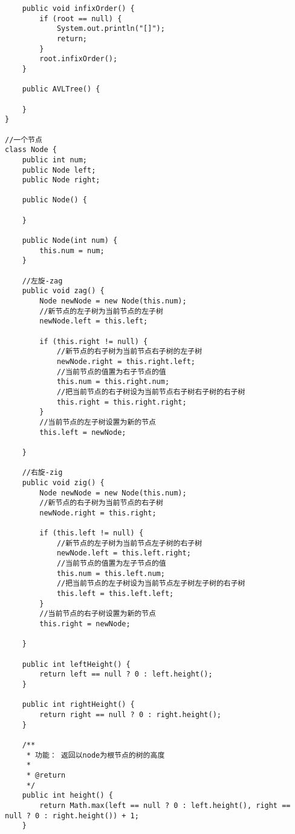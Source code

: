\documentclass[a4paper]{report}
\begin{document}
\begin{lstlisting}
    public void infixOrder() {
        if (root == null) {
            System.out.println("[]");
            return;
        }
        root.infixOrder();
    }

    public AVLTree() {

    }
}

//一个节点
class Node {
    public int num;
    public Node left;
    public Node right;

    public Node() {

    }

    public Node(int num) {
        this.num = num;
    }

    //左旋-zag
    public void zag() {
        Node newNode = new Node(this.num);
        //新节点的左子树为当前节点的左子树
        newNode.left = this.left;

        if (this.right != null) {
            //新节点的右子树为当前节点右子树的左子树
            newNode.right = this.right.left;
            //当前节点的值置为右子节点的值
            this.num = this.right.num;
            //把当前节点的右子树设为当前节点右子树右子树的右子树
            this.right = this.right.right;
        }
        //当前节点的左子树设置为新的节点
        this.left = newNode;

    }

    //右旋-zig
    public void zig() {
        Node newNode = new Node(this.num);
        //新节点的右子树为当前节点的右子树
        newNode.right = this.right;

        if (this.left != null) {
            //新节点的左子树为当前节点左子树的右子树
            newNode.left = this.left.right;
            //当前节点的值置为左子节点的值
            this.num = this.left.num;
            //把当前节点的左子树设为当前节点左子树左子树的右子树
            this.left = this.left.left;
        }
        //当前节点的右子树设置为新的节点
        this.right = newNode;

    }

    public int leftHeight() {
        return left == null ? 0 : left.height();
    }

    public int rightHeight() {
        return right == null ? 0 : right.height();
    }

    /**
     * 功能： 返回以node为根节点的树的高度
     *
     * @return
     */
    public int height() {
        return Math.max(left == null ? 0 : left.height(), right == null ? 0 : right.height()) + 1;
    }


\end{lstlisting}
\end{document}
